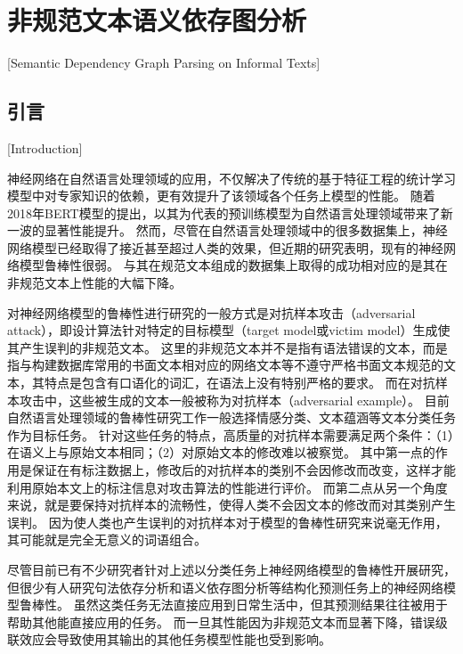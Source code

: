 
\chapter[非规范文本语义依存图分析]{非规范文本语义依存图分析}[Semantic Dependency Graph Parsing on Informal Texts]

\section{引言}[Introduction]
\label{sec:chapter3-intro}

神经网络在自然语言处理领域的应用，不仅解决了传统的基于特征工程的统计学习模型中对专家知识的依赖，更有效提升了该领域各个任务上模型的性能\cite{chen-manning-2014-fast,chiu-nichols-2016-named,ma-hovy-2016-end,zhou-etal-2016-text,chopra-etal-2016-abstractive}。
随着2018年BERT模型的提出，以其为代表的预训练模型为自然语言处理领域带来了新一波的显著性能提升\cite{peters-etal-2018-deep,devlin-etal-2018-bert,yang-etal-2019-xlnet,clark-etal-2020-electra}。
然而，尽管在自然语言处理领域中的很多数据集上，神经网络模型已经取得了接近甚至超过人类的效果，但近期的研究表明，现有的神经网络模型鲁棒性很弱。
与其在规范文本组成的数据集上取得的成功相对应的是其在非规范文本上性能的大幅下降\cite{alzantot-etal-2018-generating, ren-etal-2019-generating, cheng-etal-2019-robust,michel-etal-2019-evaluation, jin-etal-2020-isbert}。

对神经网络模型的鲁棒性进行研究的一般方式是对抗样本攻击（adversarial attack），即设计算法针对特定的目标模型（target model或victim model）生成使其产生误判的非规范文本。
这里的非规范文本并不是指有语法错误的文本，而是指与构建数据库常用的书面文本相对应的网络文本等不遵守严格书面文本规范的文本，其特点是包含有口语化的词汇，在语法上没有特别严格的要求。
而在对抗样本攻击中，这些被生成的文本一般被称为对抗样本（adversarial example）。
目前自然语言处理领域的鲁棒性研究工作一般选择情感分类、文本蕴涵等文本分类任务作为目标任务。
针对这些任务的特点，高质量的对抗样本需要满足两个条件：（1）在语义上与原始文本相同；（2）对原始文本的修改难以被察觉。
其中第一点的作用是保证在有标注数据上，修改后的对抗样本的类别不会因修改而改变，这样才能利用原始本文上的标注信息对攻击算法的性能进行评价。
而第二点从另一个角度来说，就是要保持对抗样本的流畅性，使得人类不会因文本的修改而对其类别产生误判。
因为使人类也产生误判的对抗样本对于模型的鲁棒性研究来说毫无作用，其可能就是完全无意义的词语组合。

尽管目前已有不少研究者针对上述以分类任务上神经网络模型的鲁棒性开展研究，但很少有人研究句法依存分析和语义依存图分析等结构化预测任务上的神经网络模型鲁棒性。
虽然这类任务无法直接应用到日常生活中，但其预测结果往往被用于帮助其他能直接应用的任务。
而一旦其性能因为非规范文本而显著下降，错误级联效应会导致使用其输出的其他任务模型性能也受到影响。

